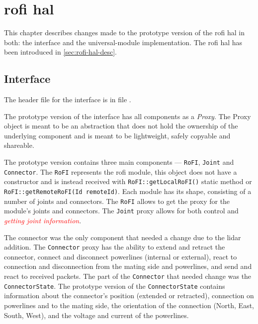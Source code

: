 \documentclass[
  digital,     %
  oneside,     %
  nosansbold,  %
  nocolorbold, %
  nolof,         %
  nolot,         %
]{fithesis4}
\newcommand{\TODO}[1]{\textcolor{red}{\textit{#1}}}
\newcommand{\TODOLIST}[1]{}
\begin{document}
{{{\chapter[ RoFI Hardware Abstraction Layer ]{ \acrshort{rofi} \acrlong{hal} } \label{ch:rofi-hal}

This chapter describes changes made to the prototype version of the \acrshort{rofi} \acrshort{hal} in both: the interface and the \gls{universal-module} implementation. The \acrshort{rofi} \acrshort{hal} has been introduced in \autoref{sec:rofi-hal-desc}.

\section{Interface} \label{sec:rofi-hal-interface}

\TODOLIST{
\begin{itemize}
    \item Current interface components - RoFI, joint, connector
    \item \textbf{Proxy} 
    \item Changes done --- Added distance and status
\end{itemize}
}

The header file for the interface is in file .

The prototype version of the interface has all components as a \emph{Proxy}. The Proxy object is meant to be an abstraction that does not hold the ownership of the underlying component and is meant to be lightweight, safely copyable and shareable.

The prototype version contains three main components --- \lstinline[breakatwhitespace]|RoFI|, \lstinline|Joint| and \lstinline|Connector|. The \lstinline|RoFI| represents the \acrshort{rofi} module, this object does not have a constructor and is instead received with \lstinline|RoFI::getLocalRoFI()| static method or \lstinline|RoFI::getRemoteRoFI(Id remoteId)|. Each module has its shape, consisting of a number of joints and connectors. The \lstinline|RoFI| allows to get the proxy for the module's joints and connectors. The \lstinline|Joint| proxy allows for both control and \TODO{getting joint information}.

The connector was the only component that needed a change due to the \acrshort{lidar} addition. The \lstinline|Connector| proxy has the ability to extend and retract the connector, connect and disconnect powerlines (internal or external), react to connection and disconnection from the mating side and powerlines, and send and react to received packets. The part of the \lstinline|Connector| that needed change was the \lstinline|ConnectorState|. The prototype version of the \lstinline|ConnectorState| contains information about the connector's position (extended or retracted), connection on powerlines and to the mating side, the orientation of the connection (North, East, South, West), and the voltage and current of the powerlines.

}}}
\end{document}

